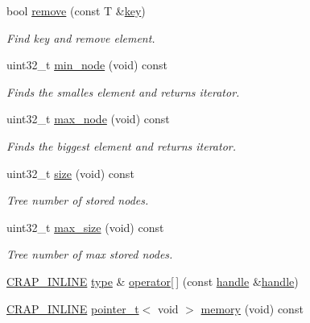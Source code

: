\begin{DoxyCompactItemize}
bool \hyperlink{classcrap_1_1binary__tree_a266ff63e1c07266b2c7f31cc29b1f5c3}{remove} (const T \&\hyperlink{classcrap_1_1binary__tree_ac119732cd07f83ed5161ebc86d0e31c6}{key})
\begin{DoxyCompactList}\small\item\em Find key and remove element. \end{DoxyCompactList}\item 
uint32\+\_\+t \hyperlink{classcrap_1_1binary__tree_aa1064fb28f8e543049a87315548edb3d}{min\+\_\+node} (void) const 
\begin{DoxyCompactList}\small\item\em Finds the smalles element and returns iterator. \end{DoxyCompactList}\item 
uint32\+\_\+t \hyperlink{classcrap_1_1binary__tree_a657c2c1f571ae0960b925c49a0141e7c}{max\+\_\+node} (void) const 
\begin{DoxyCompactList}\small\item\em Finds the biggest element and returns iterator. \end{DoxyCompactList}\item 
uint32\+\_\+t \hyperlink{classcrap_1_1binary__tree_a9e738d5a81082e3b5f653fd8e0caf705}{size} (void) const 
\begin{DoxyCompactList}\small\item\em Tree number of stored nodes. \end{DoxyCompactList}\item 
uint32\+\_\+t \hyperlink{classcrap_1_1binary__tree_aaa5e75e63d1adb33b9e564446cd6d3bd}{max\+\_\+size} (void) const 
\begin{DoxyCompactList}\small\item\em Tree number of max stored nodes. \end{DoxyCompactList}\item 
\hyperlink{config__x86_8h_a5a40526b8d842e7ff731509998bb0f1c}{C\+R\+A\+P\+\_\+\+I\+N\+L\+I\+N\+E} \hyperlink{classcrap_1_1binary__tree_a9d33f412f5a24d3201de18e8c531143d}{type} \& \hyperlink{classcrap_1_1binary__tree_a83cebad3e5b34654274156bbc50704be}{operator\mbox{[}$\,$\mbox{]}} (const \hyperlink{classcrap_1_1binary__tree_a750a57d699f2974e6a5415300a9696ff}{handle} \&\hyperlink{classcrap_1_1binary__tree_a750a57d699f2974e6a5415300a9696ff}{handle})
\item 
\hyperlink{config__x86_8h_a5a40526b8d842e7ff731509998bb0f1c}{C\+R\+A\+P\+\_\+\+I\+N\+L\+I\+N\+E} \hyperlink{structcrap_1_1pointer__t}{pointer\+\_\+t}$<$ void $>$ \hyperlink{classcrap_1_1binary__tree_a4e2a6b711e97bc978ab707bd48b44635}{memory} (void) const 
\end{DoxyCompactItemize}
